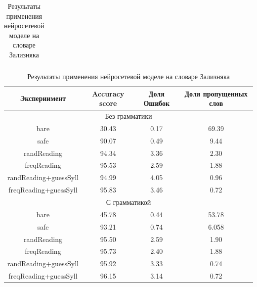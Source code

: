 \documentclass[14pt, a4paper, russian]{report}
\begin{document}
\begin{normalsize}
\begin{table}[H]
\begin{small}
\begin{center}
\begin{tabular}{|c|c|c|c|}
			\end{tabular}
		\end{center}
	\end{small}
	\caption{Результаты применения нейросетевой моделе на словаре Зализняка}
	\label{table:dict_res}
\end{table}

\begin{table}[H]
	\begin{small}
		\begin{center}
			\begin{tabular}{|c|c|c|c|}
				\hline
				Экспериимент & Accuracy score & Доля Ошибок & Доля пропущенных слов\\
				\hline
				\multicolumn{4}{|c|}{Без грамматики} \\			
				\hline
				bare & 30.43 & 0.17 & 69.39 \\
				\hline
				safe & 90.07 & 0.49 & 9.44 \\
				\hline
				randReading &94.34 &3.36 &2.30 \\
				\hline
				freqReading &95.53 &2.59& 1.88 \\
				\hline
				randReading+guessSyll &94.99 &4.05 &0.96 \\
				\hline
				freqReading+guessSyll & 95.83 &3.46 &0.72\\
				\hline
				\multicolumn{4}{|c|}{С грамматикой} \\			
				\hline
				bare &45.78 & 0.44 &53.78\\
				\hline
				safe &93.21& 0.74 &6.058 \\
				\hline
				randReading &95.50 &2.59 &1.90 \\
				\hline
				freqReading &95.73 &2.40 &1.88 \\
				\hline
				randReading+guessSyll &95.92 &3.33 &0.74 \\
				\hline
				freqReading+guessSyll &96.15 &3.14 &0.72 \\
				\hline
				
			\end{tabular}
		\end{center}
	\end{small}
	\caption{Результаты применения нейросетевой моделе на словаре Зализняка}
	\label{table:base_text}
\end{table}


\end{normalsize}
\end{document}
